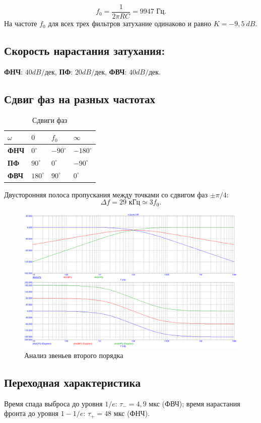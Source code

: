 \documentclass[a4paper, 12pt]{article}
\begin{document}
$$f_0 = \frac{1}{2\pi RC} = 9947 \text{ Гц}.$$
На частоте $f_0$ для всех трех фильтров затухание одинаково и равно $K = -9,5\ dB$.
\subsection*{Скорость нарастания затухания:}
\textbf{ФНЧ}: $40dB/$дек, \textbf{ПФ}: $20dB/$дек, \textbf{ФВЧ}: $40dB/$дек.
\subsection*{Сдвиг фаз на разных частотах}
\begin{table}[H]
\centering
\begin{tabular}{|l|l|l|l|}
\hline
$\omega$     & $0$         & $f_0$       & $\infty$      \\ \hline
\textbf{ФНЧ} & $0^{\circ}$ & $-90^{\circ}$ & $-180^{\circ}$ \\ \hline
\textbf{ПФ}  & $90^{\circ}$ & $0^{\circ}$ & $-90^{\circ}$ \\ \hline
\textbf{ФВЧ} & $180^{\circ}$ & $90^{\circ}$ & $0^{\circ}$ \\ \hline
\end{tabular}
\caption{Сдвиги фаз}
\end{table}

Двусторонняя полоса пропускания между точками со сдвигом фаз $\pm \pi/4$:
$$\Delta f = 29 \text{ кГц} \simeq 3f_0.$$
\begin{figure}[H]
\centering
\includegraphics[width=1\textwidth]{rcpoleanal}
\caption{Анализ звеньев второго порядка}
\end{figure}

\subsection*{Переходная характеристика}
Время спада выброса до уровня $1/e$: $\tau_{-} = 4,9$ мкс (ФВЧ); время нарастания фронта до уровня $1-1/e$: $\tau_{+} = 48$ мкс (ФНЧ).
\end{document}
